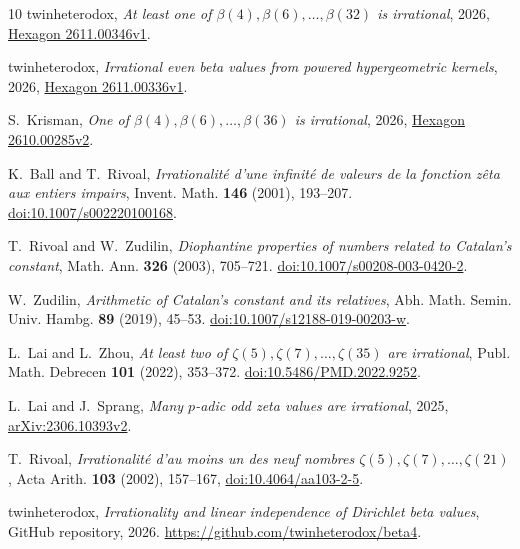 \documentclass[11pt]{article}
\theoremstyle{remark}
\numberwithin{equation}{section}
\begin{document}
\clearpage
\begin{thebibliography}{10}
twinheterodox,
\emph{At least one of $\beta(4),\beta(6),\ldots,\beta(32)$ is irrational},
2026, \href{https://hexagonmath.org/2611.00346v1}{Hexagon 2611.00346v1}.

twinheterodox,
\emph{Irrational even beta values from powered hypergeometric kernels},
2026, \href{https://hexagonmath.org/2611.00336v1}{Hexagon 2611.00336v1}.

S.~Krisman,
\emph{One of $\beta(4),\beta(6),\ldots,\beta(36)$ is irrational},
2026, \href{https://hexagonmath.org/2610.00285v2}{Hexagon 2610.00285v2}.

K.~Ball and T.~Rivoal, \emph{Irrationalit\'e d'une infinit\'e de valeurs
de la fonction z\^eta aux entiers impairs}, Invent. Math.
\textbf{146} (2001), 193--207.
\href{https://doi.org/10.1007/s002220100168}{doi:10.1007/s002220100168}.

T.~Rivoal and W.~Zudilin, \emph{Diophantine properties of numbers related
to Catalan's constant}, Math. Ann. \textbf{326} (2003), 705--721.
\href{https://doi.org/10.1007/s00208-003-0420-2}{doi:10.1007/s00208-003-0420-2}.

W.~Zudilin, \emph{Arithmetic of Catalan's constant and its relatives},
Abh. Math. Semin. Univ. Hambg. \textbf{89} (2019), 45--53.
\href{https://doi.org/10.1007/s12188-019-00203-w}{doi:10.1007/s12188-019-00203-w}.

L.~Lai and L.~Zhou, \emph{At least two of $\zeta(5),\zeta(7),\ldots,
\zeta(35)$ are irrational}, Publ. Math. Debrecen \textbf{101} (2022),
353--372. \href{https://doi.org/10.5486/PMD.2022.9252}{doi:10.5486/PMD.2022.9252}.

L.~Lai and J.~Sprang,
\emph{Many $p$-adic odd zeta values are irrational},
2025, \href{https://arxiv.org/abs/2306.10393v2}{arXiv:2306.10393v2}.

T.~Rivoal,
\emph{Irrationalit\'e d'au moins un des neuf nombres
$\zeta(5),\zeta(7),\ldots,\zeta(21)$},
Acta Arith. \textbf{103} (2002), 157--167,
\href{https://doi.org/10.4064/aa103-2-5}{doi:10.4064/aa103-2-5}.

twinheterodox, \emph{Irrationality and linear independence of Dirichlet beta values},
GitHub repository, 2026. \url{https://github.com/twinheterodox/beta4}.
\end{thebibliography}
\end{document}
